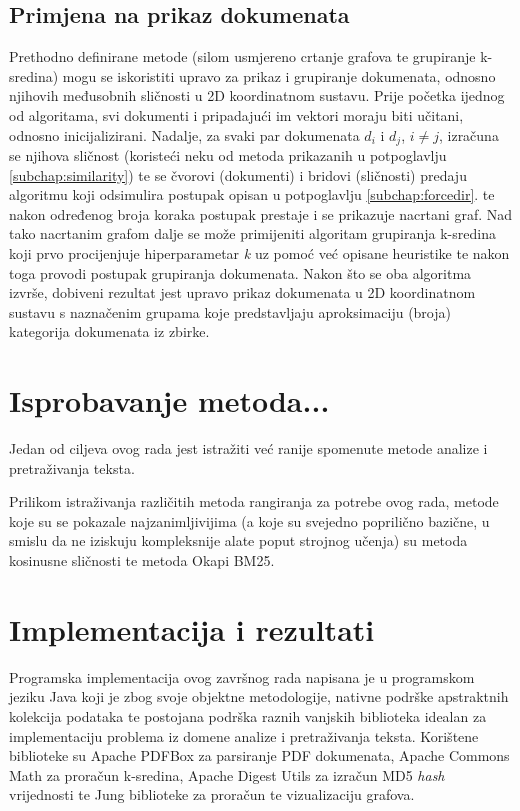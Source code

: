 \documentclass[times, utf8, zavrsni]{fer}
\begin{document}
\section{Primjena na prikaz dokumenata}
\label{sec:docdisplay}
Prethodno definirane metode (silom usmjereno crtanje grafova te grupiranje k-sredina) mogu se iskoristiti upravo za prikaz i grupiranje dokumenata, odnosno njihovih međusobnih sličnosti u 2D koordinatnom sustavu. Prije početka ijednog od algoritama, svi dokumenti i pripadajući im vektori moraju biti učitani, odnosno inicijalizirani. Nadalje, za svaki par dokumenata $d_{i}$ i $d_{j}$, $i \neq j$, izračuna se njihova sličnost (koristeći neku od metoda prikazanih u potpoglavlju \ref{subchap:similarity}) te se čvorovi (dokumenti) i bridovi (sličnosti) predaju algoritmu koji odsimulira postupak opisan u potpoglavlju \ref{subchap:forcedir}. te nakon određenog broja koraka postupak prestaje i se prikazuje nacrtani graf.
Nad tako nacrtanim grafom dalje se može primijeniti algoritam grupiranja k-sredina koji prvo procijenjuje hiperparametar \textit{k} uz pomoć već opisane heuristike te nakon toga provodi postupak grupiranja dokumenata. Nakon što se oba algoritma izvrše, dobiveni rezultat jest upravo prikaz dokumenata u 2D koordinatnom sustavu s naznačenim grupama koje predstavljaju aproksimaciju (broja) kategorija dokumenata iz zbirke.

\chapter{Isprobavanje metoda...}
Jedan od ciljeva ovog rada jest istražiti već ranije spomenute metode analize i pretraživanja teksta.

Prilikom istraživanja različitih metoda rangiranja za potrebe ovog rada, metode koje su se pokazale najzanimljivijima (a koje su svejedno poprilično bazične, u smislu da ne iziskuju kompleksnije alate poput strojnog učenja) su metoda kosinusne sličnosti te metoda Okapi BM25.

\chapter{Implementacija i rezultati}
\label{chap:impl}


Programska implementacija ovog završnog rada napisana je u programskom jeziku Java koji je zbog svoje objektne metodologije, nativne podrške apstraktnih kolekcija podataka te postojana podrška raznih vanjskih biblioteka idealan za implementaciju problema iz domene analize i pretraživanja teksta.
Korištene biblioteke su Apache PDFBox za parsiranje PDF dokumenata, Apache Commons Math za proračun k-sredina, Apache Digest Utils za izračun MD5 \textit{hash} vrijednosti te Jung biblioteke za proračun te vizualizaciju grafova.  \newline \newline
\end{document}
